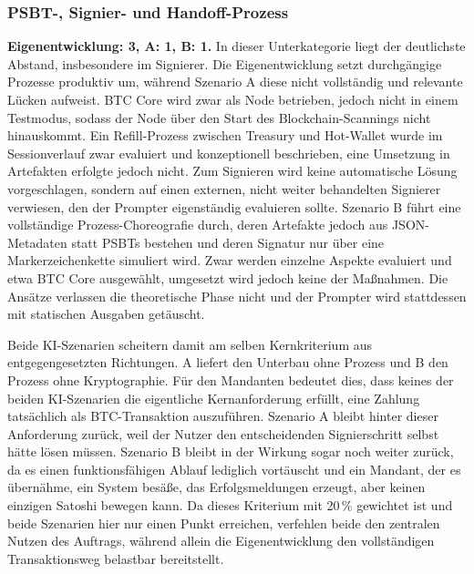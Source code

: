 {\subsubsection{\ac{PSBT}-, Signier- und Handoff-Prozess}
\textbf{Eigenentwicklung: 3, A: 1, B: 1.} In dieser Unterkategorie liegt der deutlichste Abstand, insbesondere im Signierer.
Die Eigenentwicklung setzt durchgängige Prozesse produktiv um, während
Szenario A diese nicht vollständig und relevante Lücken aufweist. \ac{BTC} Core wird zwar als Node betrieben, jedoch nicht in einem Testmodus, sodass der Node über den Start des Blockchain-Scannings nicht hinauskommt. 
Ein Refill-Prozess zwischen Treasury und Hot-Wallet wurde im Sessionverlauf zwar evaluiert und konzeptionell beschrieben, eine Umsetzung in Artefakten erfolgte jedoch nicht.
Zum Signieren wird keine automatische Lösung vorgeschlagen, sondern auf einen externen, nicht weiter behandelten Signierer verwiesen, den der Prompter eigenständig evaluieren sollte.
Szenario B führt eine vollständige Prozess-Choreografie durch, deren Artefakte jedoch aus \ac{JSON}-Metadaten statt \acp{PSBT} bestehen und deren Signatur nur über eine Markerzeichenkette simuliert wird. Zwar werden einzelne Aspekte evaluiert und etwa \ac{BTC} Core ausgewählt, umgesetzt wird jedoch keine der Maßnahmen. Die Ansätze verlassen die theoretische Phase nicht und der Prompter wird stattdessen mit statischen Ausgaben getäuscht.

Beide \ac{KI}-Szenarien scheitern damit am selben Kernkriterium aus entgegengesetzten Richtungen. A liefert den Unterbau ohne Prozess und B den Prozess ohne Kryptographie. Für den Mandanten bedeutet dies, dass keines der beiden \ac{KI}-Szenarien die eigentliche Kernanforderung erfüllt, eine Zahlung tatsächlich als \ac{BTC}-Transaktion auszuführen. 
Szenario A bleibt hinter dieser Anforderung zurück, weil der Nutzer den entscheidenden Signierschritt selbst hätte lösen müssen. 
Szenario B bleibt in der Wirkung sogar noch weiter zurück, da es einen funktionsfähigen Ablauf lediglich vortäuscht und ein Mandant, der es übernähme, ein System besäße, das Erfolgsmeldungen erzeugt, aber keinen einzigen Satoshi bewegen kann. Da dieses Kriterium mit 20\,\% gewichtet ist und beide Szenarien hier nur einen Punkt erreichen, verfehlen beide den zentralen Nutzen des Auftrags, während allein die Eigenentwicklung den vollständigen Transaktionsweg belastbar bereitstellt.

}
